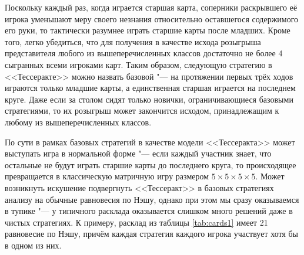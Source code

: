 Поскольку каждый раз, когда играется старшая карта, соперники раскрывшего её игрока уменьшают меру своего незнания относительно оставшегося содержимого его руки, то тактически разумнее играть старшие карты после младших. Кроме того, легко убедиться, что для получения в качестве исхода розыгрыша представителя любого из вышеперечисленных классов достаточно не более 4 сыгранных всеми игроками карт. Таким образом, следующую стратегию в <<Тессеракте>> можно назвать базовой "--- на протяжении первых трёх ходов играются только младшие карты, а единственная старшая играется на последнем круге. Даже если за столом сидят только новички, ограничивающиеся базовыми стратегиями, то их розыгрыш может закончится исходом, принадлежащим к любому из вышеперечисленных классов.

По сути в рамках базовых стратегий в качестве модели <<Тессеракта>> может выступать игра в нормальной форме "--- если каждый участник знает, что остальные не будут играть старшие карты до последнего круга, то происходящее превращается в классическую матричную игру размером $5 \times 5 \times 5 \times 5$. Может возникнуть искушение подвергнуть <<Тессеракт>> в базовых стратегиях анализу на обычные равновесия по Нэшу, однако при этом мы сразу оказываемся в тупике "--- у типичного расклада оказывается слишком много решений даже в чистых стратегиях. К примеру, расклад из таблицы \ref{tab:cards1} имеет 21 равновесие по Нэшу, причём каждая стратегия каждого игрока участвует хотя бы в одном из них.

